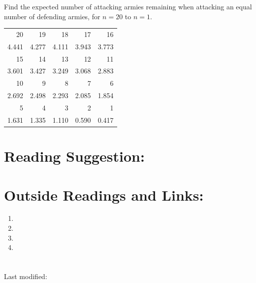 \documentclass[12pt]{article}
\begin{document}
\begin{exercise}
    Find the expected number of attacking armies remaining when
    attacking an equal number of defending armies, for \( n = 20 \) to \(
    n = 1 \).
\end{exercise}
\begin{solution}

    \begin{tabular}{rrrrr}
        20     & 19       & 18          & 17          & 16          \\ 
        4.441  & 4.277    & 4.111       & 3.943       & 3.773       \\ 
        15     & 14       & 13          & 12          & 11          \\ 
        3.601  & 3.427    & 3.249       & 3.068       & 2.883       \\ 
        10     & 9        & 8           & 7           & 6           \\ 
        2.692  & 2.498    & 2.293       & 2.085       & 1.854       \\ 
        5      & 4        & 3           & 2           & 1           \\ 
        1.631  & 1.335    & 1.110       & 0.590       & 0.417
    \end{tabular}
\end{solution}
\hr

\section*{Reading Suggestion:}




\hr

\section*{Outside Readings and Links:}
\begin{enumerate}
    \item
    \item
    \item
    \item
\end{enumerate}

\section*{\solutionsname} \loadSolutions

\hr

\mydisclaim \myfooter

Last modified:  \flastmod
\end{document}
